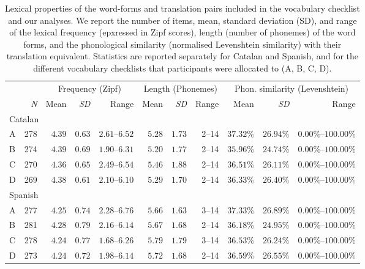 \documentclass[
  letterpaper,
  DIV=11,
  numbers=noendperiod]{scrartcl}
\begin{document}
\hypertarget{tbl-item-summary}{}
\begin{longtable}{lrrrrrrrrrr}
\caption{\label{tbl-item-summary}Lexical properties of the word-forms and translation pairs included in
the vocabulary checklist and our analyses. We report the number of
items, mean, standard deviation (SD), and range of the lexical frequency
(epxressed in Zipf scores), length (number of phonemes) of the word
forms, and the phonological similarity (normalised Levenshtein
similarity) with their translation equivalent. Statistics are reported
separately for Catalan and Spanish, and for the different vocabulary
checklists that participants were allocated to (A, B, C, D). }\tabularnewline

\toprule
 &  & \multicolumn{3}{c}{Frequency (Zipf)} & \multicolumn{3}{c}{Length (Phonemes)} & \multicolumn{3}{c}{Phon. similarity (Levenshtein)} \\ 
\cmidrule(lr){3-5} \cmidrule(lr){6-8} \cmidrule(lr){9-11}
 & \emph{N} & Mean & \emph{SD} & Range & Mean & \emph{SD} & Range & Mean & \emph{SD} & Range \\ 
\midrule
\multicolumn{11}{l}{Catalan} \\ 
\midrule
A & 278 & $4.39$ & $0.63$ & $2.61$–$6.52$ & $5.28$ & $1.73$ & 2–14 & $37.32\%$ & $26.94\%$ & $0.00\%$–$100.00\%$ \\ 
B & 274 & $4.39$ & $0.69$ & $1.90$–$6.31$ & $5.20$ & $1.77$ & 2–14 & $35.96\%$ & $24.74\%$ & $0.00\%$–$100.00\%$ \\ 
C & 270 & $4.36$ & $0.65$ & $2.49$–$6.54$ & $5.46$ & $1.88$ & 2–14 & $36.51\%$ & $26.11\%$ & $0.00\%$–$100.00\%$ \\ 
D & 269 & $4.38$ & $0.61$ & $2.10$–$6.10$ & $5.29$ & $1.70$ & 2–14 & $36.33\%$ & $26.40\%$ & $0.00\%$–$100.00\%$ \\ 
\midrule
\multicolumn{11}{l}{Spanish} \\ 
\midrule
A & 277 & $4.25$ & $0.74$ & $2.28$–$6.76$ & $5.66$ & $1.63$ & 3–14 & $37.33\%$ & $26.89\%$ & $0.00\%$–$100.00\%$ \\ 
B & 281 & $4.28$ & $0.79$ & $2.16$–$6.14$ & $5.67$ & $1.68$ & 2–14 & $36.18\%$ & $24.95\%$ & $0.00\%$–$100.00\%$ \\ 
C & 278 & $4.24$ & $0.77$ & $1.68$–$6.26$ & $5.79$ & $1.79$ & 3–14 & $36.53\%$ & $26.24\%$ & $0.00\%$–$100.00\%$ \\ 
D & 273 & $4.24$ & $0.72$ & $1.98$–$6.14$ & $5.72$ & $1.68$ & 2–14 & $36.59\%$ & $26.55\%$ & $0.00\%$–$100.00\%$ \\ 
\bottomrule
\end{longtable}
\end{document}
